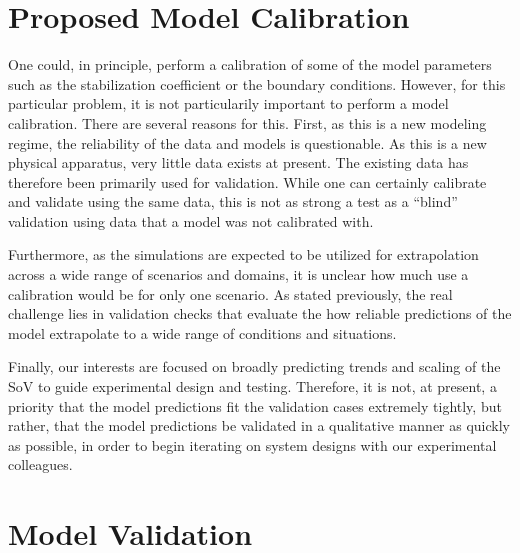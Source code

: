 \documentclass{article}
\begin{document}
%
%

\section{Proposed Model Calibration}

One could, in principle, perform a calibration of some of the model
parameters such as the stabilization coefficient or the boundary
conditions. However, for this particular problem, it is not particularily important to
perform a model calibration. There are several reasons for this. First,
as this is a new modeling regime, the reliability of the data and models
is questionable. As this is a new physical apparatus, very little data
exists at present. The existing data has therefore been
primarily used for validation. While one can certainly
calibrate and validate using the same data, this is not as strong a test 
as a ``blind'' validation using data that a model was not calibrated with. 

Furthermore, as the simulations are expected to be utilized for
extrapolation across a wide range of scenarios and domains, it is
unclear how much use a calibration would be for only one scenario. As
stated previously, the real challenge lies in validation checks that
evaluate the how reliable predictions of the model extrapolate to a wide
range of conditions and situations. 

Finally, our interests are focused on broadly predicting trends and
scaling of the SoV to guide experimental design and testing. Therefore,
it is not, at present, a priority that the model predictions fit the validation
cases extremely tightly, but rather, that the model predictions be
validated in a qualitative manner as quickly as possible, in order to
begin iterating on system designs with our experimental colleagues. 

%
%
\section{Model Validation}
\end{document}
